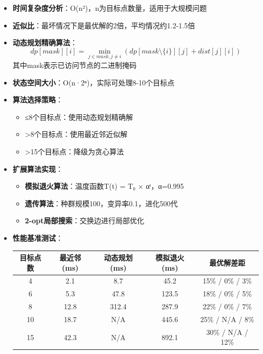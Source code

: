 \documentclass[12pt,a4paper]{article}
\begin{document}
\begin{itemize}
\begin{verbatim}
    return path, total_distance
    \end{verbatim}
    \item \textbf{时间复杂度分析}：O(n²)，n为目标点数量，适用于大规模问题
    \item \textbf{近似比}：最坏情况下是最优解的2倍，平均情况约1.2-1.5倍
    \item \textbf{动态规划精确算法}：
    \[dp[mask][i] = \min_{j \in mask, j \neq i}(dp[mask \setminus \{i\}][j] + dist[j][i])\]
    其中mask表示已访问节点的二进制掩码
    \item \textbf{状态空间大小}：O(n·2ⁿ)，实际可处理8-10个目标点
    \item \textbf{算法选择策略}：
    \begin{itemize}
        \item ≤8个目标点：使用动态规划精确解
        \item >8个目标点：使用最近邻近似解
        \item >15个目标点：降级为贪心算法
    \end{itemize}
    \item \textbf{扩展算法实现}：
    \begin{itemize}
        \item \textbf{模拟退火算法}：温度函数T(t) = T₀ × αᵗ，α=0.995
        \item \textbf{遗传算法}：种群规模100，变异率0.1，进化500代
        \item \textbf{2-opt局部搜索}：交换边进行局部优化
    \end{itemize}
    \item \textbf{性能基准测试}：
    \begin{center}
    \begin{tabular}{|c|c|c|c|c|}
    \hline
    \textbf{目标点数} & \textbf{最近邻(ms)} & \textbf{动态规划(ms)} & \textbf{模拟退火(ms)} & \textbf{最优解差距} \\
    \hline
    4 & 2.1 & 8.7 & 45.2 & 15\% / 0\% / 3\% \\
    6 & 5.3 & 47.8 & 123.5 & 18\% / 0\% / 5\% \\
    8 & 12.8 & 312.4 & 287.9 & 22\% / 0\% / 7\% \\
    10 & 18.7 & N/A & 445.6 & 25\% / N/A / 8\% \\
    15 & 42.3 & N/A & 892.1 & 30\% / N/A / 12\% \\
    \hline
    \end{tabular}
    \end{center}
\end{itemize}
\end{document}
